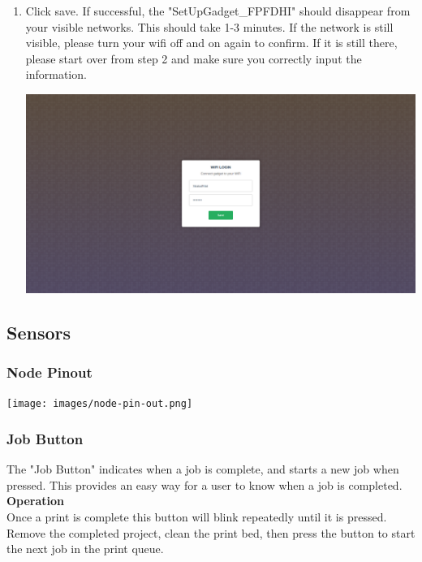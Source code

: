 \begin{enumerate}
      \item Click save. If successful, the "SetUpGadget\_FPFDHI" should disappear
      from your visible networks. This should take 1-3 minutes. If the network is still
      visible, please turn your wifi off and on again to confirm. If it is still there,
      please start over from step 2 and make sure you correctly input the information.
      \begin{center}
      \includegraphics[scale=0.25]{images/wifi-login.png}
    \end{center}
    \end{enumerate}

  \subsection{Sensors}
  \subsubsection{Node Pinout}
  \begin{center}
        \texttt{[image: images/node-pin-out.png]}
  \end{center}
    \subsubsection{Job Button}
      The "Job Button" indicates when a job is complete, and starts a new job when pressed. This provides an easy way
      for a user to know when a job is completed.\\

      \textbf{Operation}\\
      Once a print is complete this button will blink repeatedly until it is pressed.  Remove the completed project,
      clean the print bed, then press the button to start the next job in the print queue.\\

